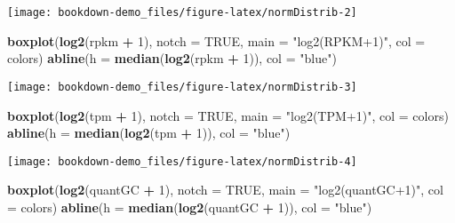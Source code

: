 \documentclass[]{book}
\newenvironment{Shaded}{\begin{snugshade}}{\end{snugshade}}
\newcommand{\DataTypeTok}[1]{\textcolor[rgb]{0.13,0.29,0.53}{#1}}
\newcommand{\DecValTok}[1]{\textcolor[rgb]{0.00,0.00,0.81}{#1}}
\newcommand{\KeywordTok}[1]{\textcolor[rgb]{0.13,0.29,0.53}{\textbf{#1}}}
\newcommand{\NormalTok}[1]{#1}
\newcommand{\OperatorTok}[1]{\textcolor[rgb]{0.81,0.36,0.00}{\textbf{#1}}}
\newcommand{\OtherTok}[1]{\textcolor[rgb]{0.56,0.35,0.01}{#1}}
\newcommand{\StringTok}[1]{\textcolor[rgb]{0.31,0.60,0.02}{#1}}
\begin{document}
\begin{center}\texttt{[image: bookdown-demo\_files/figure-latex/normDistrib-2]} \end{center}

\begin{Shaded}
\begin{Highlighting}[]

\KeywordTok{boxplot}\NormalTok{(}\KeywordTok{log2}\NormalTok{(rpkm }\OperatorTok{+}\StringTok{ }\DecValTok{1}\NormalTok{), }\DataTypeTok{notch =} \OtherTok{TRUE}\NormalTok{, }\DataTypeTok{main =} \StringTok{"log2(RPKM+1)"}\NormalTok{, }
  \DataTypeTok{col =}\NormalTok{ colors)}
\KeywordTok{abline}\NormalTok{(}\DataTypeTok{h =} \KeywordTok{median}\NormalTok{(}\KeywordTok{log2}\NormalTok{(rpkm }\OperatorTok{+}\StringTok{ }\DecValTok{1}\NormalTok{)), }\DataTypeTok{col =} \StringTok{"blue"}\NormalTok{)}
\end{Highlighting}
\end{Shaded}

\begin{center}\texttt{[image: bookdown-demo\_files/figure-latex/normDistrib-3]} \end{center}

\begin{Shaded}
\begin{Highlighting}[]

\KeywordTok{boxplot}\NormalTok{(}\KeywordTok{log2}\NormalTok{(tpm }\OperatorTok{+}\StringTok{ }\DecValTok{1}\NormalTok{), }\DataTypeTok{notch =} \OtherTok{TRUE}\NormalTok{, }\DataTypeTok{main =} \StringTok{"log2(TPM+1)"}\NormalTok{, }\DataTypeTok{col =}\NormalTok{ colors)}
\KeywordTok{abline}\NormalTok{(}\DataTypeTok{h =} \KeywordTok{median}\NormalTok{(}\KeywordTok{log2}\NormalTok{(tpm }\OperatorTok{+}\StringTok{ }\DecValTok{1}\NormalTok{)), }\DataTypeTok{col =} \StringTok{"blue"}\NormalTok{)}
\end{Highlighting}
\end{Shaded}

\begin{center}\texttt{[image: bookdown-demo\_files/figure-latex/normDistrib-4]} \end{center}

\begin{Shaded}
\begin{Highlighting}[]

\KeywordTok{boxplot}\NormalTok{(}\KeywordTok{log2}\NormalTok{(quantGC }\OperatorTok{+}\StringTok{ }\DecValTok{1}\NormalTok{), }\DataTypeTok{notch =} \OtherTok{TRUE}\NormalTok{, }\DataTypeTok{main =} \StringTok{"log2(quantGC+1)"}\NormalTok{, }
  \DataTypeTok{col =}\NormalTok{ colors)}
\KeywordTok{abline}\NormalTok{(}\DataTypeTok{h =} \KeywordTok{median}\NormalTok{(}\KeywordTok{log2}\NormalTok{(quantGC }\OperatorTok{+}\StringTok{ }\DecValTok{1}\NormalTok{)), }\DataTypeTok{col =} \StringTok{"blue"}\NormalTok{)}
\end{Highlighting}
\end{Shaded}
\end{document}
